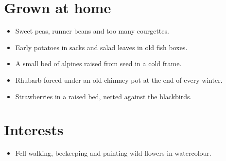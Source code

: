 \documentclass[11pt,a4paper,sans]{moderncv}
\begin{document}
\section{Grown at home}
\vspace{1pt}
{\small
\begin{itemize}
    \item Sweet peas, runner beans and too many courgettes.
    \item Early potatoes in sacks and salad leaves in old fish boxes.
    \item A small bed of alpines raised from seed in a cold frame.
    \item Rhubarb forced under an old chimney pot at the end of every winter.
    \item Strawberries in a raised bed, netted against the blackbirds.
\end{itemize}\par}
\addvspace{.5em}

\section{Interests}
\vspace{1pt}
{\small
\begin{itemize}
    \item Fell walking, beekeeping and painting wild flowers in watercolour.
\end{itemize}\par}
\addvspace{.5em}
\end{document}
